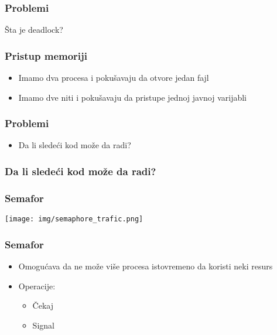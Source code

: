 \documentclass{beamer}
\begin{document}
\begin{frame}
    \frametitle{Problemi}
    \begin{center}
        Šta je deadlock?
    \end{center}
\end{frame}

\begin{frame}
    \frametitle{Pristup memoriji}
    \begin{itemize}
        \item Imamo dva procesa i pokušavaju da otvore jedan fajl \newline
        \item Imamo dve niti i pokušavaju da pristupe jednoj javnoj varijabli
    \end{itemize}
\end{frame}

\begin{frame}
    \frametitle{Problemi}
    \begin{itemize}
        \item Da li sledeći kod može da radi?
    \end{itemize}
\end{frame}

\begin{frame}
    \frametitle{Da li sledeći kod može da radi?}
\end{frame}

\begin{frame}
    \frametitle{Semafor}
    \begin{center}
        \texttt{[image: img/semaphore\_trafic.png]}
    \end{center}
\end{frame}

\begin{frame}
    \frametitle{Semafor}
    \begin{itemize}
        \item Omogućava da ne može više procesa istovremeno da koristi neki resurs \newline
        \item Operacije: \begin{itemize}
            \item Čekaj
            \item Signal
        \end{itemize}
    \end{itemize}
\end{frame}
\end{document}
